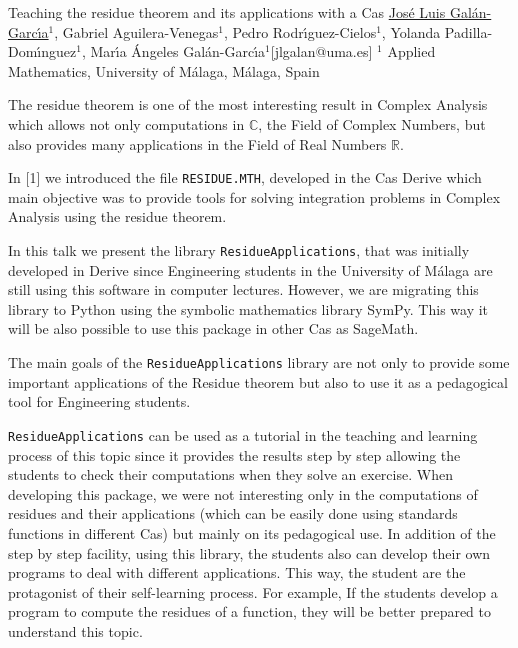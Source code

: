 


\begin{abstract_online}{Teaching the residue theorem and its applications with a {\sc Cas}}{%
        \underline{Jos\'e Luis Gal\'an-Garc\'{\i}a}$^{1}$, Gabriel Aguilera-Venegas$^{1}$, Pedro Rodr\'{\i}guez-Cielos$^{1}$, Yolanda Padilla-Dom\'{\i}nguez$^{1}$, Mar\'{\i}a \'Angeles Gal\'an-Garc\'{\i}a$^{1}$}{[jlgalan@uma.es]
        }{%
        $^1$ Applied Mathematics, University of M\'alaga, M\'alaga, Spain%
}

The residue theorem is one of the most interesting result in Complex Analysis which allows not only computations in $\mathbb{C}$, the Field of Complex Numbers, but also provides many applications in the Field of Real Numbers $\mathbb{R}$.
 
In [1] we introduced the file {\tt RESIDUE.MTH}, developed in the {\sc Cas Derive} which main objective was to provide tools for solving integration problems in Complex Analysis using the residue theorem.

In this talk we present the library {\tt ResidueApplications}, that was initially developed in {\sc Derive} since Engineering students in the University of M\'alaga are still using this software in computer lectures. However, we are migrating this library to {\sc Python} using the symbolic mathematics library {\sc SymPy}. This way it will be also possible to use this package in other {\sc Cas} as {\sc SageMath}. 

The main goals of the {\tt ResidueApplications} library are not only to provide some important applications of the Residue theorem but also to use it as a pedagogical tool for Engineering students.

{\tt ResidueApplications} can be used as a tutorial in the teaching and learning process of this topic since it provides the results step by step allowing the students to check their computations when they solve an exercise. When developing this package, we were not interesting only in the computations of residues and their applications (which can be easily done using standards functions in different {\sc Cas}) but mainly on its pedagogical use. In addition of the step by step facility, using this library, the students also can develop their own programs to deal with different applications. This way, the student are the protagonist of their self-learning process. For example, If the students develop a program to compute the residues of a function, they will be better prepared to understand this topic.


\end{abstract_online}
